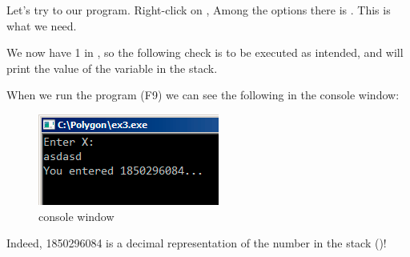 Let's try to  our program.
Right-click on \EAX, 
Among the options there is .
This is what we need.

We now have 1 in \EAX, so the following check is to be executed as intended, 
and \printf will print the value of the variable in the stack.

When we run the program (F9) we can see the following in the console window:

\begin{figure}[H]
\centering
\includegraphics[scale=\FigScale]{patterns/04_scanf/3_checking_retval/olly_3.png}
\caption{console window}
\end{figure}

Indeed, 1850296084 is a decimal representation of the number in the stack ()!
